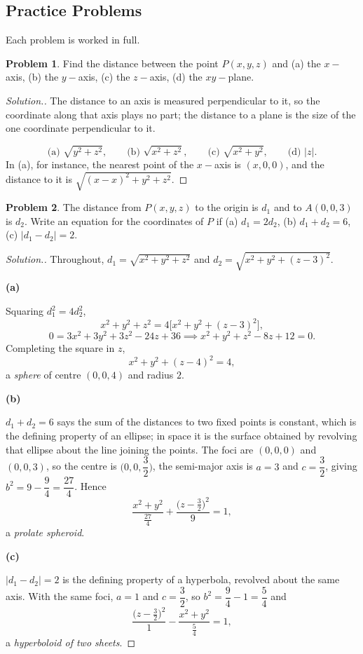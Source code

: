 \documentclass[11pt,a4paper]{article}
\theoremstyle{definition}
\newtheorem{problemx}{Problem}[subsection]
\newenvironment{problem}{\begin{problemx}}{\end{problemx}}
\newenvironment{solution}
  {\renewcommand{\qedsymbol}{}\begin{proof}[\textit{Solution}.]}
  {\end{proof}}
\newcommand{\subhead}[1]{%
  \par\medskip\noindent\textbf{#1}\par\nobreak\smallskip}
\begin{document}
\subsection{Practice Problems}

Each problem is worked in full.

\begin{problem}
Find the distance between the point $P(x,y,z)$ and (a) the $x-$axis,
(b) the $y-$axis, (c) the $z-$axis, (d) the $xy-$plane.
\end{problem}
\begin{solution}
The distance to an axis is measured perpendicular to it, so the coordinate along
that axis plays no part; the distance to a plane is the size of the one
coordinate perpendicular to it.

$$\text{(a) } \sqrt{y^2+z^2},\qquad \text{(b) } \sqrt{x^2+z^2},\qquad
\text{(c) } \sqrt{x^2+y^2},\qquad \text{(d) } \left|z\right| .$$
In (a), for instance, the nearest point of the $x-$axis is $(x,0,0)$, and the
distance to it is $\sqrt{(x-x)^2+y^2+z^2}$.
\end{solution}

\begin{problem}
The distance from $P(x,y,z)$ to the origin is $d_1$ and to $A(0,0,3)$ is $d_2$.
Write an equation for the coordinates of $P$ if
(a) $d_1 = 2d_2$, (b) $d_1+d_2 = 6$, (c) $\left|d_1-d_2\right| = 2$.
\end{problem}
\begin{solution}
Throughout, $d_1 = \sqrt{x^2+y^2+z^2}$ and
$d_2 = \sqrt{x^2+y^2+(z-3)^2}$.

\subhead{(a)}
Squaring $d_1^2 = 4d_2^2$,
$$x^2+y^2+z^2 = 4\Big[x^2+y^2+(z-3)^2\Big] ,$$
$$0 = 3x^2+3y^2+3z^2 - 24z + 36
\implies x^2+y^2+z^2-8z+12 = 0 .$$
Completing the square in $z$,
$$x^2+y^2+(z-4)^2 = 4 ,$$
a \emph{sphere} of centre $(0,0,4)$ and radius $2$.

\subhead{(b)}
$d_1+d_2 = 6$ says the sum of the distances to two fixed points is constant,
which is the defining property of an ellipse; in space it is the surface
obtained by revolving that ellipse about the line joining the points. The foci
are $(0,0,0)$ and $(0,0,3)$, so the centre is $\Big(0,0,\dfrac32\Big)$, the
semi-major axis is $a = 3$ and $c = \dfrac32$, giving
$b^2 = 9 - \dfrac94 = \dfrac{27}{4}$. Hence
$$\frac{x^2+y^2}{\frac{27}{4}} + \frac{\big(z-\frac32\big)^2}{9} = 1 ,$$
a \emph{prolate spheroid}.

\subhead{(c)}
$\left|d_1-d_2\right| = 2$ is the defining property of a hyperbola, revolved
about the same axis. With the same foci, $a = 1$ and $c = \dfrac32$, so
$b^2 = \dfrac94 - 1 = \dfrac54$ and
$$\frac{\big(z-\frac32\big)^2}{1} - \frac{x^2+y^2}{\frac54} = 1 ,$$
a \emph{hyperboloid of two sheets}.
\end{solution}
\end{document}

